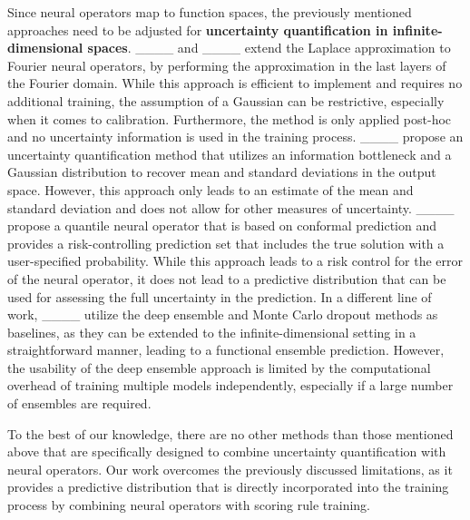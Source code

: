 Since neural operators map to function spaces, the previously mentioned approaches need to be adjusted for \textbf{uncertainty quantification in infinite-dimensional spaces}. ____ and ____ extend the Laplace approximation to Fourier neural operators, by performing the approximation in the last layers of the Fourier domain. While this approach is efficient to implement and requires no additional training, the assumption of a Gaussian can be restrictive, especially when it comes to calibration. Furthermore, the method is only applied post-hoc and no uncertainty information is used in the training process. ____ propose an uncertainty quantification method that utilizes an information bottleneck and a Gaussian distribution to recover mean and standard deviations in the output space. However, this approach only leads to an estimate of the mean and standard deviation and does not allow for other measures of uncertainty. ____ propose a quantile neural operator that is based on conformal prediction and provides a risk-controlling prediction set that includes the true solution with a user-specified probability. While this approach leads to a risk control for the error of the neural operator, it does not lead to a predictive distribution that can be used for assessing the full uncertainty in the prediction. In a different line of work, ____ utilize the deep ensemble and Monte Carlo dropout methods as baselines, as they can be extended to the infinite-dimensional setting in a straightforward manner, leading to a functional ensemble prediction. However, the usability of the deep ensemble approach is limited by the computational overhead of training multiple models independently, especially if a large number of ensembles are required.

To the best of our knowledge, there are no other methods than those mentioned above that are specifically designed to combine uncertainty quantification with neural operators. Our work overcomes the previously discussed limitations, as it provides a predictive distribution that is directly incorporated into the training process by combining neural operators with scoring rule training.